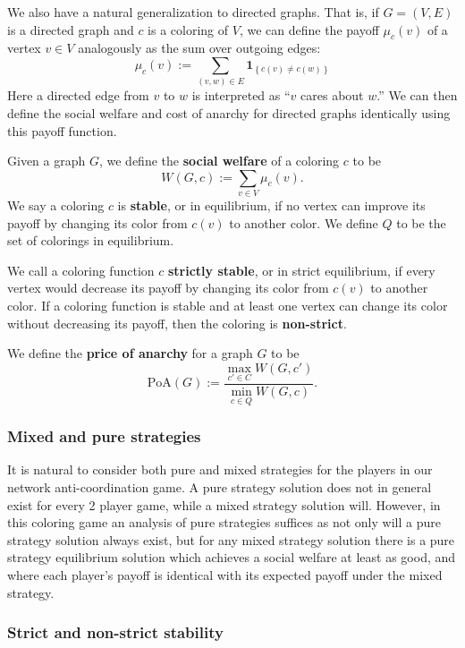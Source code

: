 \documentclass{llncs}
\newcommand{\ind}[1]{\textbf{1}_{\left \{ #1 \right \}}}
\begin{document}
We also have a natural generalization to directed graphs.  That is, if $G =
(V,E)$ is a directed graph and $c$ is a coloring of $V$, we can define the
payoff $\mu_c(v)$ of a vertex $v \in V$ analogously as the sum over outgoing
edges:
\[ 
	\mu_c(v) := \sum_{(v,w) \in E} \ind{c(v) \neq c(w)}
\]
Here a directed edge from $v$ to $w$ is interpreted as ``$v$ cares about $w$.''
We can then define the social welfare and cost of anarchy for directed graphs
identically using this payoff function. 


Given a graph $G$, we define the \textbf{social welfare} of a coloring $c$ to
be
\[
   W(G,c) := \sum_{v \in V} \mu_c(v).
\]
We say a coloring $c$ is \textbf{stable}, or in {equilibrium}, if no vertex can
improve its payoff by changing its color from $c(v)$ to another color. We
define $Q$ to be the set of colorings in equilibrium.

We call a coloring function $c$ \textbf{strictly stable}, or in {strict
equilibrium}, if every vertex would decrease its payoff by changing its color
from $c(v)$ to another color. If a coloring function is stable and at least one
vertex can change its color without decreasing its payoff, then the coloring is
\textbf{non-strict}.


We define the \textbf{price of anarchy} for a graph $G$ to be
\[
\mbox{PoA}(G) := \frac{\max_{c' \in C}W(G,c')}
{\min_{c \in Q}W(G,c)}.
\]

\subsubsection{Mixed and pure strategies}

It is natural to consider both pure and mixed strategies for the players in our
network anti-coordination game.  A pure strategy solution does not in general
exist for every 2 player game, while a mixed strategy solution will.  However,
in this coloring game an analysis of pure strategies suffices as not only will
a pure strategy solution always exist, but for any mixed strategy solution
there is a pure strategy equilibrium solution which achieves a social welfare
at least as good, and where each player's payoff is identical with its
expected payoff under the mixed strategy.

\subsubsection{Strict and non-strict stability}
\end{document}
